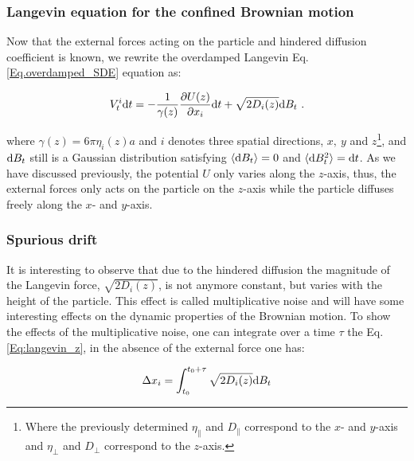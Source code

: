 \subsubsection{Langevin equation for the confined Brownian motion}

Now that the external forces acting on the particle and hindered diffusion coefficient is known, we rewrite the overdamped Langevin Eq.\ref{Eq.overdamped_SDE} equation as:

\begin{equation}
	V_t^i \textnormal{d}t  = -\frac{1}{\gamma(z)}\frac{\partial U(z)}{\partial x_i}  \textnormal{d}t + \sqrt{2D_i (z)}  \textnormal{d}B_t ~.
	\label{Eq:langevin_z}
\end{equation}

where $\gamma(z) = 6 \pi \eta_i(z) a$ and $i$ denotes three spatial directions, $x,~ y$ and $z$\footnote{Where the previously determined $\eta_\parallel$ and $D_\parallel$ correspond to the $x$- and $y$-axis and $\eta_\bot$ and $D_\bot$ correspond to the $z$-axis.}, and  $ \textnormal{d}B_t$ still is a Gaussian distribution satisfying $\langle \textnormal{d}B_t \rangle = 0$ and $\langle \textnormal{d}B_t ^2 \rangle = \textnormal{d}t$. As we have discussed previously, the potential $U$ only varies along the $z$-axis, thus, the external forces only acts on the particle on the $z$-axis while the particle diffuses freely along the $x$- and $y$-axis. 

\subsubsection{Spurious drift}

It is interesting to observe that due to the hindered diffusion the magnitude of the Langevin force, $\sqrt{2D_i(z)}$, is not anymore constant, but varies with the height of the particle. This effect is called multiplicative noise and will have some interesting effects on the dynamic properties of the Brownian motion. To show the effects of the multiplicative noise, one can integrate over a time $\tau$ the Eq.\ref{Eq:langevin_z}, in the absence of the external force one has:

\begin{equation}
	\Delta x_i = \int_{t_0} ^{t_0 + \tau} \sqrt{2D_i(z)}\textnormal{d}B_t
	\label{int}
\end{equation}

